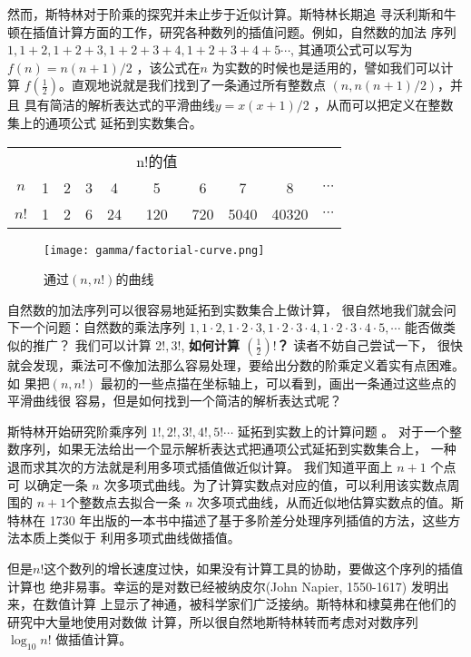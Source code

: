 {然而，斯特林对于阶乘的探究并未止步于近似计算。斯特林长期追
寻沃利斯和牛顿在插值计算方面的工作，研究各种数列的插值问题。例如，自然数的加法
序列 $1, 1+2, 1+2+3, 1+2+3+4, 1+2+3+4+5 \cdots$, 其通项公式可以写为 $f(n) =
n(n+1)/2$ ，该公式在$n$ 为实数的时候也是适用的，譬如我们可以计算
$f(\frac{1}{2})$。直观地说就是我们找到了一条通过所有整数点 $(n,n(n+1)/2)$，并且
具有简洁的解析表达式的平滑曲线$y=x(x+1)/2$ ，从而可以把定义在整数集上的通项公式
延拓到实数集合。

\begin{table}[htb]
\centering
\begin{tabular*}{0.9\textwidth}{@{\extracolsep{\fill}}|cccccccccc|}
\hline
&&&&& n!的值 &&&& \\
$n$ & 1 & 2 & 3 & 4 & 5 & 6 & 7 & 8 & $\cdots$ \\
$n!$ & 1 & 2 & 6 & 24 & 120 & 720 & 5040 & 40320 & $\cdots$ \\
\hline
\end{tabular*}
\end{table}

\begin{figure}[htbp]
\centering
\texttt{[image: gamma/factorial-curve.png]}
\caption{通过$(n,n!)$的曲线}
\end{figure}

自然数的加法序列可以很容易地延拓到实数集合上做计算，
很自然地我们就会问下一个问题：自然数的乘法序列 $1,1\cdot2, 1\cdot2\cdot3,
1\cdot2\cdot3\cdot4, 1\cdot2\cdot3\cdot4\cdot5,  \cdots$ 能否做类似的推广？
我们可以计算 $2!,3!$, {\bf 如何计算 $(\frac{1}{2})!$？} 读者不妨自己尝试一下，
很快就会发现，乘法可不像加法那么容易处理，要给出分数的阶乘定义着实有点困难。 如
果把$(n,n!)$ 最初的一些点描在坐标轴上，可以看到，画出一条通过这些点的平滑曲线很
容易，但是如何找到一个简洁的解析表达式呢？

斯特林开始研究阶乘序列 $1!, 2!,3!,4!,5!  \cdots$ 延拓到实数上的计算问题
。 对于一个整数序列，如果无法给出一个显示解析表达式把通项公式延拓到实数集合上，
一种退而求其次的方法就是利用多项式插值做近似计算。 我们知道平面上 $n+1$ 个点可
以确定一条 $n$ 次多项式曲线。为了计算实数点对应的值，可以利用该实数点周围的
$n+1$个整数点去拟合一条 $n$ 次多项式曲线，从而近似地估算实数点的值。斯特林在
1730 年出版的一本书中描述了基于多阶差分处理序列插值的方法，这些方法本质上类似于
利用多项式曲线做插值。


但是$n!$这个数列的增长速度过快，如果没有计算工具的协助，要做这个序列的插值计算也
绝非易事。幸运的是对数已经被纳皮尔(John Napier, 1550-1617) 发明出来，在数值计算
上显示了神通，被科学家们广泛接纳。斯特林和棣莫弗在他们的研究中大量地使用对数做
计算，所以很自然地斯特林转而考虑对对数序列 $\log_{10} n!$ 做插值计算。 

}
